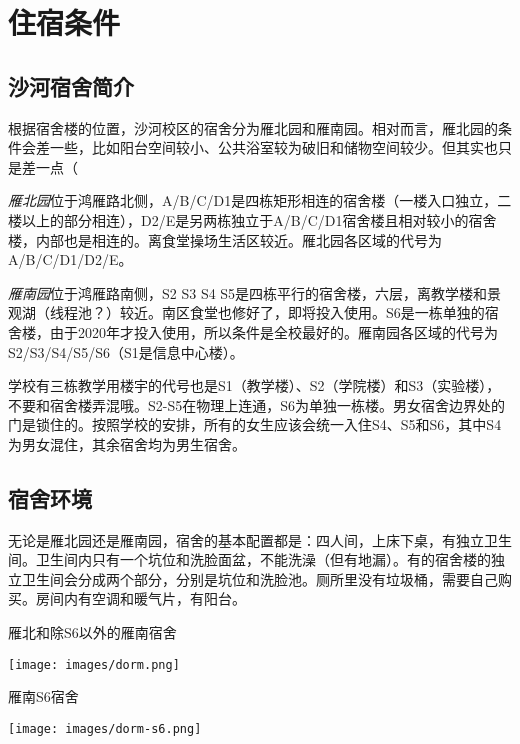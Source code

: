\section{住宿条件}

\subsection{沙河宿舍简介}

根据宿舍楼的位置，沙河校区的宿舍分为雁北园和雁南园。相对而言，雁北园的条件会差一些，比如阳台空间较小、公共浴室较为破旧和储物空间较少。但其实也只是差一点（

\emph{雁北园}位于鸿雁路北侧，A/B/C/D1是四栋矩形相连的宿舍楼（一楼入口独立，二楼以上的部分相连），D2/E是另两栋独立于A/B/C/D1宿舍楼且相对较小的宿舍楼，内部也是相连的。离食堂操场生活区较近。雁北园各区域的代号为A/B/C/D1/D2/E。

\emph{雁南园}位于鸿雁路南侧，S2 S3 S4 S5是四栋平行的宿舍楼，六层，离教学楼和景观湖（线程池？）较近。南区食堂也修好了，即将投入使用。S6是一栋单独的宿舍楼，由于2020年才投入使用，所以条件是全校最好的。雁南园各区域的代号为S2/S3/S4/S5/S6（S1是信息中心楼）。

学校有三栋教学用楼宇的代号也是S1（教学楼）、S2（学院楼）和S3（实验楼），不要和宿舍楼弄混哦。S2-S5在物理上连通，S6为单独一栋楼。男女宿舍边界处的门是锁住的。按照学校的安排，所有的女生应该会统一入住S4、S5和S6，其中S4为男女混住，其余宿舍均为男生宿舍。

\subsection{宿舍环境}

无论是雁北园还是雁南园，宿舍的基本配置都是：四人间，上床下桌，有独立卫生间。卫生间内只有一个坑位和洗脸面盆，不能洗澡（但有地漏）。有的宿舍楼的独立卫生间会分成两个部分，分别是坑位和洗脸池。厕所里没有垃圾桶，需要自己购买。房间内有空调和暖气片，有阳台。

\begin{center}
    \begin{minipage}{0.45\textwidth}
        \centerline{\sffamily\small 雁北和除S6以外的雁南宿舍}
        \centerline{\texttt{[image: images/dorm.png]}}
    \end{minipage}
    \qquad
    \begin{minipage}{0.45\textwidth}
        \centerline{\sffamily\small 雁南S6宿舍}
        \centerline{\texttt{[image: images/dorm-s6.png]}}
    \end{minipage}
\end{center}

